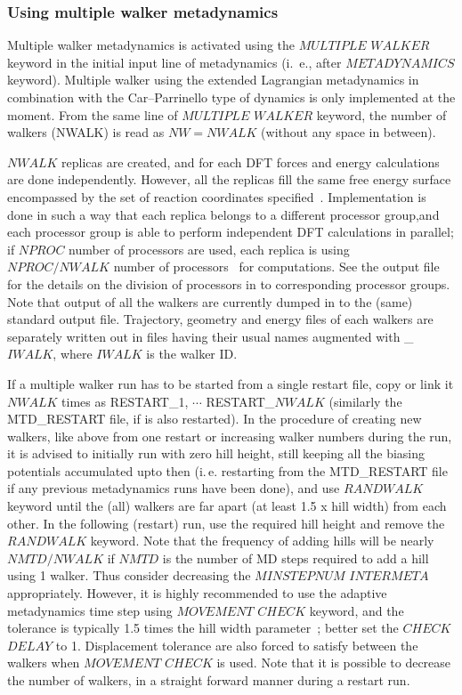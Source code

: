 \documentclass[twoside,10pt,titlepage,a4paper]{article}
\begin{document}
\subsubsection{Using multiple walker metadynamics}
\label{sect:mw}

Multiple walker metadynamics is activated using the $MULTIPLE$ $WALKER$ keyword
in the initial input line of metadynamics (i.~e., after $METADYNAMICS$ keyword).
%
Multiple walker using the extended Lagrangian metadynamics in combination with
the Car--Parrinello type of dynamics is only implemented at the moment.
%
From the same line of $MULTIPLE$ $WALKER$ keyword, the number of walkers (NWALK)
is read as $NW=NWALK$ (without any space in between).

$NWALK$ replicas are created, and for each DFT forces and energy calculations are done
independently.
%
However, all the replicas fill the same free energy surface encompassed
by the set of reaction coordinates specified~\cite{Raiteri05}.
%
Implementation is done in such a way that each replica belongs to a different processor
group,and each processor group is able to perform independent DFT calculations in parallel;
if $NPROC$ number of processors are used, each replica is using $NPROC/NWALK$
number of processors~\cite{Nair-inside-08} for computations.
%
See the output file for the details on the division of processors in to corresponding processor groups.
%
Note that output of all the walkers are currently dumped in to the (same) standard output file.
%
Trajectory, geometry and energy files of each walkers are separately written out
in files having their usual names augmented with \_$IWALK$, where $IWALK$ is the walker ID.


If a multiple walker run has to be started from a single restart file, copy or link it
$NWALK$ times as RESTART\_1, $\cdots$ RESTART\_$NWALK$ (similarly the MTD\_RESTART file,
if is also restarted).
%
In the procedure of creating new walkers, like above from one restart or increasing walker numbers
during the run, it is advised to initially run with zero hill height, still keeping all the biasing
potentials accumulated upto then (i.\,e.  restarting from the MTD\_RESTART file if any previous
metadynamics runs have been done), and use $RANDWALK$ keyword until the (all) walkers are far apart
(at least 1.5 x hill width) from each other.
%
In the following (restart) run, use the required hill height and remove the $RANDWALK$ keyword.
%
Note that the frequency of adding hills will be nearly $NMTD/NWALK$ if $NMTD$ is the number
of MD steps required to add a hill using 1 walker.
%
Thus consider decreasing the $MINSTEPNUM$ $INTERMETA$ appropriately.
%
However, it is highly recommended to use the adaptive metadynamics time step using $MOVEMENT$ $CHECK$
keyword, and the tolerance is typically 1.5 times the hill width parameter~\cite{Nair-jacs-08}; better
set the $CHECK$ $DELAY$ to 1.
%
Displacement tolerance are also forced to satisfy between the walkers when $MOVEMENT$ $CHECK$ is used.
%
Note that it is possible to decrease the number of walkers, in a straight forward manner during a
restart run.
%
\end{document}
